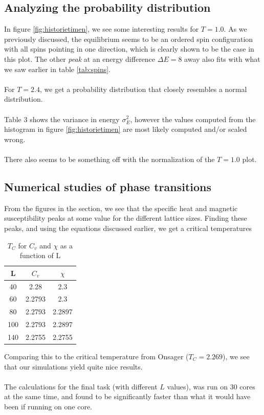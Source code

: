 \documentclass{article}
\begin{document}
\subsection{Analyzing the probability distribution}
In figure \ref{fig:historietimen}, we see some interesting results for $T=1.0$. As we previously discussed, the equilibrium seems to be an ordered spin configuration with all spins pointing in one direction, which is clearly shown to be the case in this plot. The other \textit{peak} at an energy difference $\Delta E = 8$ away also fits with what we saw earlier in table \ref{tab:spins}.\\\\
For $T=2.4$, we get a probability distribution that closely resembles a normal distribution. \\\\
Table 3 shows the variance in energy $\sigma_E^2$, however the values computed from the histogram in figure \ref{fig:historietimen} are most likely computed and/or scaled wrong.\\\\
There also seems to be something off with the normalization of the $T=1.0$ plot.
\subsection{Numerical studies of phase transitions}
From the figures in the section, we see that the specific heat and magnetic susceptibility peaks at some value for the different lattice sizes. Finding these peaks, and using the equations discussed earlier, we get a critical temperatures
\begin{table}[H]
\centering
\caption{$T_C$ for $C_v$ and $\chi$ as a function of L}
\begin{tabular}{c|c|c}
L & $C_v$ & $\chi$ \\ \hline
40 & 2.28 & 2.3 \\
60 & 2.2793 & 2.3 \\
80 & 2.2793 & 2.2897 \\
100 & 2.2793 & 2.2897 \\
140 & 2.2755 & 2.2755 \\
\end{tabular}
\label{tab:e}
\end{table}
Comparing this to the critical temperature from Onsager \cite{cite:lars_onsager} ($T_C = 2.269$), we see that our simulations yield quite nice results.\\\\
The calculations for the final task (with different $L$ values), was run on 30 cores at the same time, and found to be significantly faster than what it would have been if running on one core.

{}

\end{document}
